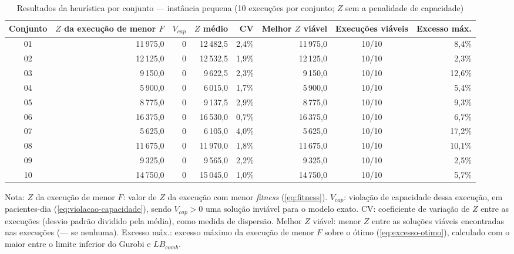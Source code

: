 \begin{table}[htbp]
    \caption{Resultados da heurística por conjunto --- instância pequena (10 execuções por conjunto; $Z$ sem a penalidade de capacidade)}
    \label{tab:res-z-pequeno}
    \centering
    \begin{adjustbox}{max width=\textwidth}
    \begin{tabular}{crrrrrcr}
        \hline
        \textbf{Conjunto} & \textbf{$Z$ da execução de menor $F$} & \textbf{$V_{cap}$} & \textbf{$Z$ médio} & \textbf{CV} & \textbf{Melhor $Z$ viável} & \textbf{Execuções viáveis} & \textbf{Excesso máx.} \\
        \hline
        01 & 11\,975,0 & 0 & 12\,482,5 & 2,4\% & 11\,975,0 & 10/10 & 8,4\% \\
        02 & 12\,125,0 & 0 & 12\,532,5 & 1,9\% & 12\,125,0 & 10/10 & 2,3\% \\
        03 & 9\,150,0 & 0 & 9\,622,5 & 2,3\% & 9\,150,0 & 10/10 & 12,6\% \\
        04 & 5\,900,0 & 0 & 6\,015,0 & 1,7\% & 5\,900,0 & 10/10 & 5,4\% \\
        05 & 8\,775,0 & 0 & 9\,137,5 & 2,9\% & 8\,775,0 & 10/10 & 9,3\% \\
        06 & 16\,375,0 & 0 & 16\,530,0 & 0,7\% & 16\,375,0 & 10/10 & 6,7\% \\
        07 & 5\,625,0 & 0 & 6\,105,0 & 4,0\% & 5\,625,0 & 10/10 & 17,2\% \\
        08 & 11\,675,0 & 0 & 11\,970,0 & 1,8\% & 11\,675,0 & 10/10 & 10,1\% \\
        09 & 9\,325,0 & 0 & 9\,565,0 & 2,2\% & 9\,325,0 & 10/10 & 2,5\% \\
        10 & 14\,750,0 & 0 & 15\,045,0 & 1,0\% & 14\,750,0 & 10/10 & 5,7\% \\
        \hline
    \end{tabular}
    \end{adjustbox}
    \par\smallskip
    {\footnotesize Nota: $Z$ da execução de menor $F$: valor de $Z$ da execução com menor \textit{fitness} (\autoref{eq:fitness}). $V_{cap}$: violação de capacidade dessa execução, em pacientes-dia (\autoref{eq:violacao-capacidade}), sendo $V_{cap} > 0$ uma solução inviável para o modelo exato. CV: coeficiente de variação de $Z$ entre as execuções (desvio padrão dividido pela média), como medida de dispersão. Melhor $Z$ viável: menor $Z$ entre as soluções viáveis encontradas nas execuções (--- se nenhuma). Excesso máx.: excesso máximo da execução de menor $F$ sobre o ótimo (\autoref{eq:excesso-otimo}), calculado com o maior entre o limite inferior do Gurobi e $LB_{comb}$.}
\end{table}
